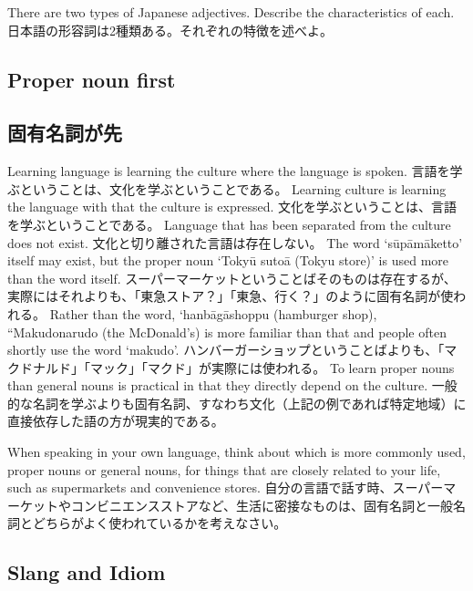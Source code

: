 \documentclass[uplatex,dvipdfmx,b5paper,english,10pt]{jsbook}
\begin{document}
\begin{toiquestion}
\ifEnglish
There are two types of Japanese adjectives. Describe the characteristics of each.
\else
日本語の形容詞は2種類ある。それぞれの特徴を述べよ。
\fi
\end{toiquestion}


\ifEnglish
\subsection{Proper noun first}
\else
\subsection{固有名詞が先}
\fi

\ifEnglish
Learning language is learning the culture where the language is spoken.
\else
言語を学ぶということは、文化を学ぶということである。
\fi
\ifEnglish
Learning culture is learning the language with that the culture is expressed.
\else
文化を学ぶということは、言語を学ぶということである。
\fi
\ifEnglish
Language that has been separated from the culture does not exist.
\else
文化と切り離された言語は存在しない。
\fi
\ifEnglish
The word `s\=up\=am\=aketto'  itself may exist, but the proper noun `Toky\=u suto\=a (Tokyu store)' is used more than the word itself.
\else
スーパーマーケットということばそのものは存在するが、実際にはそれよりも、「東急ストア？」「東急、行く？」のように固有名詞が使われる。
\fi
\ifEnglish
Rather than the word, `hanb\=ag\=ashoppu (hamburger shop), ``Makudonarudo (the McDonald's) is more familiar than that and people often shortly use the word `makudo'.
\else
ハンバーガーショップということばよりも、「マクドナルド」「マック」「マクド」が実際には使われる。
\fi
\ifEnglish
To learn proper nouns than general nouns is practical in that they directly depend on the culture.
\else
一般的な名詞を学ぶよりも固有名詞、すなわち文化（上記の例であれば特定地域）に直接依存した語の方が現実的である。
\fi

\begin{toiquestion}
\ifEnglish
When speaking in your own language, think about which is more commonly used, proper nouns or general nouns, for things that are closely related to your life, such as supermarkets and convenience stores.
\else
自分の言語で話す時、スーパーマーケットやコンビニエンスストアなど、生活に密接なものは、固有名詞と一般名詞とどちらがよく使われているかを考えなさい。
\fi
\end{toiquestion}

\ifEnglish
\subsection{Slang and Idiom}
\else
\end{document}
